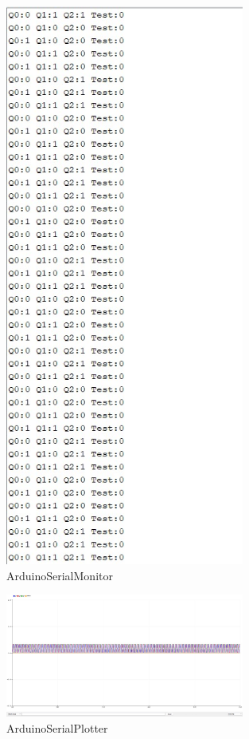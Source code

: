 \documentclass[12pt,a4paper]{article}
\begin{document}
\begin{figure}[H]
    \centering
    \includegraphics[width=0.7\textwidth]{figs/SerialMonitor.jpeg} 
    \caption{ArduinoSerialMonitor}
\end{figure}
\begin{figure}[H]
    \centering
    \includegraphics[width=0.7\textwidth]{figs/SerialPlotter.jpeg} 
    \caption{ArduinoSerialPlotter}
\end{figure}
\end{document}
